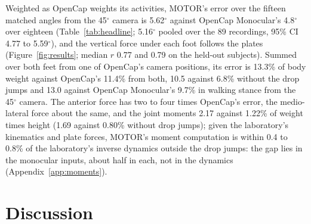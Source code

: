 \documentclass[11pt]{article}
\newcommand{\dg}{\ensuremath{^\circ}}
\begin{document}
Weighted as OpenCap weights its activities, MOTOR's error over the fifteen matched angles from the 45\dg{} camera is
5.62\dg{} against OpenCap Monocular's 4.8\dg{} over eighteen (Table~\ref{tab:headline}; 5.16\dg{} pooled over the 89
recordings, 95\% CI 4.77 to 5.59\dg), and the vertical force under each foot follows the plates
(Figure~\ref{fig:results}; median $r$ 0.77 and 0.79 on the held-out subjects). Summed over both feet from one of
OpenCap's camera positions, its error is 13.3\% of body weight against OpenCap's 11.4\% from both, 10.5 against 6.8\%
without the drop jumps and 13.0 against OpenCap Monocular's 9.7\% in walking stance from the 45\dg{} camera. The
anterior force has two to four times OpenCap's error, the medio-lateral force about the same, and the joint moments
2.17 against 1.22\% of weight times height (1.69 against 0.80\% without drop jumps); given the laboratory's
kinematics and plate forces, MOTOR's moment computation is within 0.4 to 0.8\% of the laboratory's inverse dynamics
outside the drop jumps: the gap lies in the monocular inputs, about half in each, not in the dynamics
(Appendix~\ref{app:moments}).
\section{Discussion}

\end{document}
